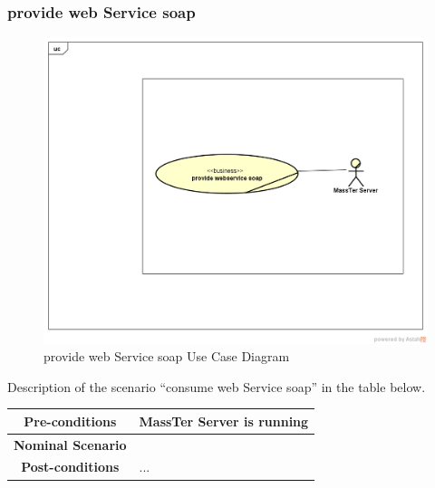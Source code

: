 	 \subsubsection{provide web Service soap} 
	 	\begin{figure}[h]
	 	\centering
	 	\includegraphics[width=1.0\textwidth]{provideWebServiceSoap.png}
	 	\caption{provide web Service soap Use Case Diagram}
	 	
	 \end{figure}
  Description of the scenario ``consume web Service soap'' in the table below.
   \begin{table}
  	\centering
  	\begin{tabular}{|c|p{10cm}|}
  		\hline 	
  		\textbf{Pre-conditions } & MassTer Server is running  \\ 
  		\hline                     
  		\textbf{Nominal Scenario } & \\ 
  		\hline 
  		\textbf{Post-conditions} & ... \\
  		\hline 
  	\end{tabular}
  \end{table}
 \clearpage
 \newpage
